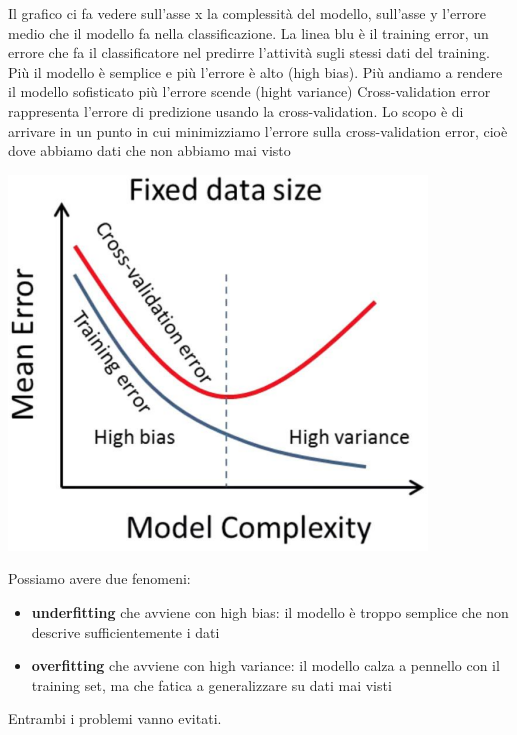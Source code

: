 \begin{minipage}{.55\textwidth}
    Il grafico ci fa vedere sull'asse x la complessità del modello, sull'asse y l'errore medio che il modello fa nella classificazione. La linea blu è il training error, un errore che fa il classificatore nel predirre l'attività sugli stessi dati del training. Più il modello è semplice e più l'errore è alto (high bias). Più andiamo a rendere il modello sofisticato più l'errore scende (hight variance)
    Cross-validation error rappresenta l'errore di predizione usando la cross-validation. 
    Lo scopo è di arrivare in un punto in cui minimizziamo l'errore sulla cross-validation error, cioè dove abbiamo dati che non abbiamo mai visto
\end{minipage} 
\hfill
\begin{minipage}{.45\textwidth}
    \begin{center}
        \includegraphics[width=.9\textwidth]{images/MobiDEV/6. activity recognition/leave one out.PNG}
    \end{center}
\end{minipage}

Possiamo avere due fenomeni:
\begin{itemize}
    \item \textbf{underfitting} che avviene con high bias: il modello è troppo semplice che non descrive sufficientemente i dati 
    \item \textbf{overfitting} che avviene con high variance: il modello calza a pennello con il training set, ma che fatica a generalizzare su dati mai visti
\end{itemize}
Entrambi i problemi vanno evitati.


